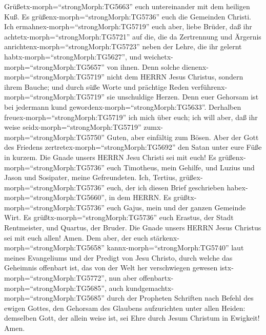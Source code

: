  Grüßetx-morph=``strongMorph:TG5663'' euch untereinander
mit dem heiligen Kuß. Es grüßenx-morph=``strongMorph:TG5736'' euch die
Gemeinden Christi.  Ich
ermahnex-morph=``strongMorph:TG5719'' euch aber, liebe Brüder, daß ihr
achtetx-morph=``strongMorph:TG5721'' auf die, die da Zertrennung und
Ärgernis anrichtenx-morph=``strongMorph:TG5723'' neben der Lehre, die
ihr gelernt habtx-morph=``strongMorph:TG5627'', und
weichetx-morph=``strongMorph:TG5657'' von ihnen.  Denn
solche dienenx-morph=``strongMorph:TG5719'' nicht dem HERRN Jesus
Christus, sondern ihrem Bauche; und durch süße Worte und prächtige Reden
verführenx-morph=``strongMorph:TG5719'' sie unschuldige Herzen.
 Denn euer Gehorsam ist bei jedermann kund
gewordenx-morph=``strongMorph:TG5633''. Derhalben
freuex-morph=``strongMorph:TG5719'' ich mich über euch; ich will aber,
daß ihr weise seidx-morph=``strongMorph:TG5719''
zumx-morph=``strongMorph:TG5750'' Guten, aber einfältig zum Bösen.
 Aber der Gott des Friedens
zertretex-morph=``strongMorph:TG5692'' den Satan unter eure Füße in
kurzem. Die Gnade unsers HERRN Jesu Christi sei mit euch! 
Es grüßenx-morph=``strongMorph:TG5736'' euch Timotheus, mein Gehilfe,
und Luzius und Jason und Sosipater, meine Gefreundeten. 
Ich, Tertius, grüßex-morph=``strongMorph:TG5736'' euch, der ich diesen
Brief geschrieben habex-morph=``strongMorph:TG5660'', in dem HERRN.
 Es grüßtx-morph=``strongMorph:TG5736'' euch Gajus, mein
und der ganzen Gemeinde Wirt. Es grüßtx-morph=``strongMorph:TG5736''
euch Erastus, der Stadt Rentmeister, und Quartus, der Bruder.
 Die Gnade unsers HERRN Jesus Christus sei mit euch allen!
Amen.  Dem aber, der euch
stärkenx-morph=``strongMorph:TG5658'' kannx-morph=``strongMorph:TG5740''
laut meines Evangeliums und der Predigt von Jesu Christo, durch welche
das Geheimnis offenbart ist, das von der Welt her verschwiegen gewesen
istx-morph=``strongMorph:TG5772'',  nun aber
offenbartx-morph=``strongMorph:TG5685'', auch
kundgemachtx-morph=``strongMorph:TG5685'' durch der Propheten Schriften
nach Befehl des ewigen Gottes, den Gehorsam des Glaubens aufzurichten
unter allen Heiden:  demselben Gott, der allein weise ist,
sei Ehre durch Jesum Christum in Ewigkeit! Amen.
